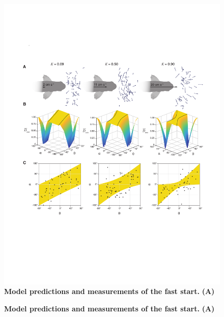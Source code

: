 \documentclass[12pt]{article}
\begin{document}
\pagebreak
\begin{figure}[t]
\begin{centering}
\includegraphics[width=1\textwidth]{Fig_03.pdf}
\centering	
\caption{\textbf{Model predictions and measurements of the fast start.} \textbf{(A)}  }
\label{our_topo}
\end{centering}
\end{figure}


\pagebreak
\begin{figure}[t]
\begin{centering}
\centering	
\caption{\textbf{Model predictions and measurements of the fast start.} \textbf{(A)}  }
\label{k>1_topo}
\end{centering}
\end{figure}






\end{document}
